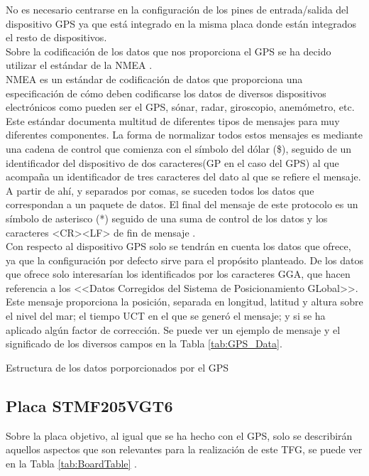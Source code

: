No es necesario centrarse en la configuración de los pines de entrada/salida del dispositivo GPS ya que está integrado en la misma placa donde están integrados el resto de dispositivos.\\

Sobre la codificación de los datos que nos proporciona el GPS se ha decido utilizar el estándar de la \acf{NMEA} \cite{bib:commandGPS}.\\

\acs{NMEA} es un estándar de codificación de datos que proporciona una especificación de cómo deben codificarse los datos de diversos dispositivos electrónicos como pueden ser el GPS, sónar, radar, giroscopio, anemómetro, etc. Este estándar documenta multitud de diferentes tipos de mensajes para muy diferentes componentes. La forma de normalizar todos estos mensajes es mediante una cadena de control que comienza con el símbolo del dólar (\$), seguido de un identificador del dispositivo de dos caracteres(GP en el caso del GPS) al que acompaña un identificador de tres caracteres del dato al que se refiere el mensaje. A partir de ahí, y separados por comas, se suceden todos los datos que correspondan a un paquete de datos. El final del mensaje de este protocolo es un símbolo de asterisco (*) seguido de una suma de control de los datos y los caracteres <CR><LF> de fin de mensaje \cite{bib:nmea}.\\

Con respecto al dispositivo GPS solo se tendrán en cuenta los datos que ofrece, ya que la configuración por defecto sirve para el propósito planteado. De los datos que ofrece solo interesarían los identificados por los caracteres GGA, que hacen referencia a los <<Datos Corregidos del Sistema de Posicionamiento GLobal>>. Este mensaje proporciona la posición, separada en longitud, latitud y altura sobre el nivel del mar; el tiempo UCT en el que se generó el mensaje; y si se ha aplicado algún factor de corrección. Se puede ver un ejemplo de mensaje y el significado de los diversos campos en la Tabla \ref{tab:GPS_Data}.\\

\begin{table}[h!]
\centering

\caption {Estructura de los datos porporcionados por el GPS}
\label{tab:GPS_Data}
\end{table}


\subsection{Placa STMF205VGT6}
Sobre la placa objetivo, al igual que se ha hecho con el GPS, solo se describirán aquellos aspectos que son relevantes para la realización de este TFG, se puede ver en la Tabla \ref{tab:BoardTable} \cite{bib:datasheet}.\\


